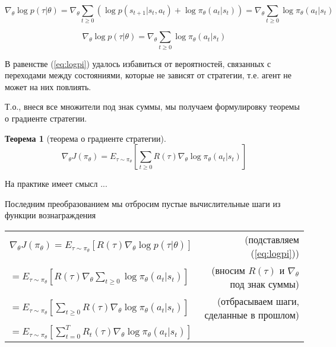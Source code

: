 \documentclass[a4paper,12pt]{article}
\newtheorem{theorem}{Теорема}[section]
\numberwithin{equation}{section}
\begin{document}
\begin{equation*} 
	\nabla_\theta \log p(\tau | \theta) = \nabla_\theta 
\sum_{t \ge 0} \left( \log p(s_{t+1} | s_t, a_t) + \log \pi_\theta(a_t | s_t) \right) = \nabla_\theta \sum_{t \ge 0} \log \pi_\theta (a_t | s_t)
\end{equation*}

\begin{equation} \label{eq:logpi}
	\nabla_\theta \log p(\tau | \theta) = \nabla_\theta \sum_{t \ge 0} \log \pi_\theta (a_t | s_t)
\end{equation}

В равенстве (\ref{eq:logpi}) удалось избавиться от вероятностей, связанных с переходами между состояниями, которые не зависят от стратегии, т.е. агент не может на них повлиять. 

Т.о., внеся все множители под знак суммы, мы получаем формулировку теоремы о градиенте стратегии. 

\begin{theorem}[теорема о градиенте стратегии]
	\begin{equation} \label{eq:strategy}
	\nabla_\theta J(\pi_{\theta}) = E_{\tau \sim \pi_{\theta}} \left[ \sum_{t \ge 0} R(\tau) \nabla_\theta  \log \pi_\theta (a_t | s_t) \right]
	\end{equation}
\end{theorem}


На практике имеет смысл ...


Последним преобразованием мы отбросим пустые вычислительные шаги из функции вознаграждения \\

\begin{tabular}{lr}
	$ \nabla_\theta J(\pi_{\theta}) = E_{\tau \sim \pi_{\theta}} \left[ R(\tau) \nabla_\theta \log p(\tau | \theta) \right]$ & (подставляем (\ref{eq:logpi})) \\ [2ex] 
	$= E_{\tau \sim \pi_{\theta}} \left[ R(\tau) \nabla_\theta \sum_{t \ge 0} \log \pi_\theta (a_t | s_t) \right]$ & (вносим $R(\tau)$ и $\nabla_\theta$ под знак суммы) \\ [2ex]
	$= E_{\tau \sim \pi_{\theta}} \left[ \sum_{t \ge 0} R(\tau) \nabla_\theta  \log \pi_\theta (a_t | s_t) \right]$ & (отбрасываем шаги, сделанные в прошлом) \\ [2ex]
	$= E_{\tau \sim \pi_{\theta}} \left[ \sum_{t = 0}^{T} R_t(\tau) \nabla_\theta  \log \pi_\theta (a_t | s_t) \right]$ & \\[2ex]
\end{tabular}
\end{document}
